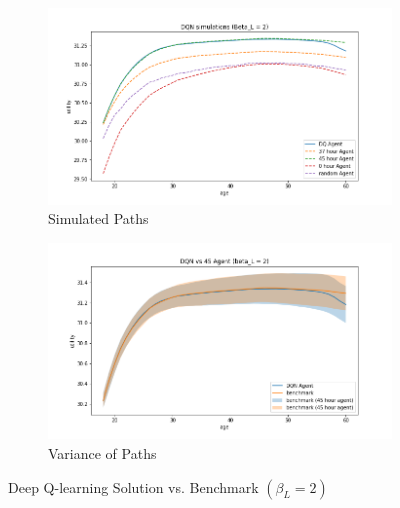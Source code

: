 \begin{figure}[ht]
\begin{subfigure}{.5\textwidth}
  \centering
  \includegraphics[width=1\linewidth]{figures/dqn_model1_beta_2_solution_benchmark_paths.png}
  \caption{Simulated Paths}
  \label{fig:dqn_solution_beta2_path}
\end{subfigure}%
\begin{subfigure}{.5\textwidth}
  \centering
  \includegraphics[width=1\linewidth]{figures/dqn_model1_beta_2_solution_benchmark_variance.png}
  \caption{Variance of Paths}
  \label{fig:dqn_solution_beta2_var}
\end{subfigure}
    \caption{Deep Q-learning Solution vs. Benchmark $(\beta_L = 2)$}
    \label{fig:dqn_solution_beta2}
\end{figure}

